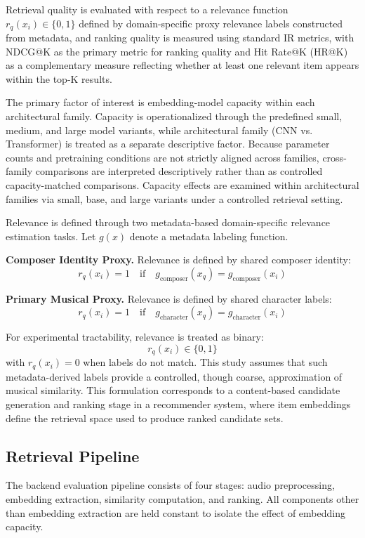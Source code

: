 \documentclass[sigconf]{acmart}
\begin{document}
Retrieval quality is evaluated with respect to a relevance function $r_q(x_i) \in \{0,1\}$ defined by domain-specific proxy relevance labels constructed from metadata, and ranking quality is measured using standard IR metrics, with NDCG@K as the primary metric for ranking quality and Hit Rate@K (HR@K) as a complementary measure reflecting whether at least one relevant item appears within the top-K results.

The primary factor of interest is embedding-model capacity within each architectural family. Capacity is operationalized through the predefined small, medium, and large model variants, while architectural family (CNN vs. Transformer) is treated as a separate descriptive factor. Because parameter counts and pretraining conditions are not strictly aligned across families, cross-family comparisons are interpreted descriptively rather than as controlled capacity-matched comparisons. Capacity effects are examined within architectural families via small, base, and large variants under a controlled retrieval setting.

Relevance is defined through two metadata-based domain-specific relevance estimation tasks. Let $g(x)$ denote a metadata labeling
function.

\textbf{Composer Identity Proxy.} Relevance is defined by shared composer identity:
\[
r_q(x_i) = 1 \quad \text{if} \quad g_{\text{composer}}(x_q) = g_{\text{composer}}(x_i)
\]

\textbf{Primary Musical Proxy.} Relevance is defined by shared character labels:
\[
r_q(x_i) = 1 \quad \text{if} \quad g_{\text{character}}(x_q) = g_{\text{character}}(x_i)
\]

For experimental tractability, relevance is treated as binary:
\[
r_q(x_i) \in \{0,1\}
\]
with $r_q(x_i)=0$ when labels do not match. This study assumes that such metadata-derived labels
provide a controlled, though coarse, approximation of musical similarity.
This formulation corresponds to a content-based candidate generation and ranking stage in a recommender system, 
where item embeddings define the retrieval space used to produce ranked candidate sets.

\subsection{Retrieval Pipeline}
The backend evaluation pipeline consists of four stages: audio preprocessing, embedding extraction, similarity computation, and ranking. All components other than embedding extraction are held constant to isolate the effect of embedding capacity.
\end{document}
